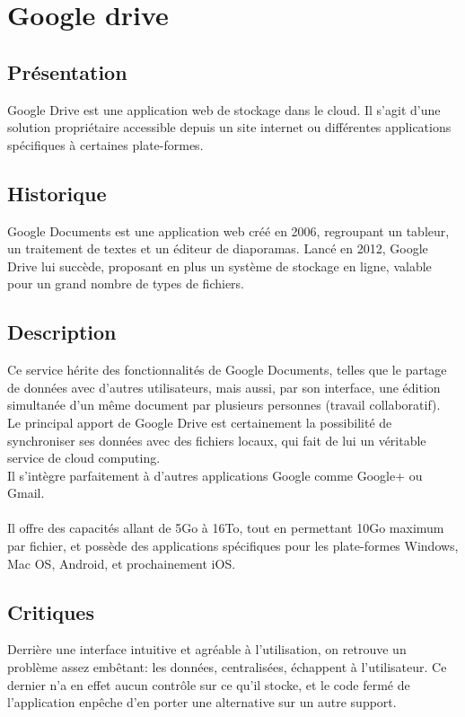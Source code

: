 \section{Google drive}
\thispagestyle{EIP} %

\subsection{Présentation}
Google Drive est une application web de stockage dans le cloud. Il s'agit d'une solution propriétaire accessible depuis un site internet ou différentes applications spécifiques à certaines plate-formes.

\subsection{Historique}
Google Documents est une application web créé en 2006, regroupant un tableur, un traitement de textes et un éditeur de diaporamas.
Lancé en 2012, Google Drive lui succède, proposant en plus un système de stockage en ligne, valable pour un grand nombre de types de fichiers.\\

\subsection{Description}
Ce service hérite des fonctionnalités de Google Documents, telles que le partage de données avec d'autres utilisateurs, mais aussi, par son interface, une édition simultanée d'un même document par plusieurs personnes (travail collaboratif).\\
Le principal apport de Google Drive est certainement la possibilité de synchroniser ses données avec des fichiers locaux, qui fait de lui un véritable service de cloud computing.\\
Il s'intègre parfaitement à d'autres applications Google comme Google+ ou Gmail.\\
\\
Il offre des capacités allant de 5Go à 16To, tout en permettant 10Go maximum par fichier, et possède des applications spécifiques pour les plate-formes Windows, Mac OS, Android, et prochainement iOS.\\

\subsection{Critiques}
Derrière une interface intuitive et agréable à l'utilisation, on retrouve un problème assez embêtant: les données, centralisées, échappent à l'utilisateur. Ce dernier n'a en effet aucun contrôle sur ce qu'il stocke, et le code fermé de l'application enpêche d'en porter une alternative sur un autre support.